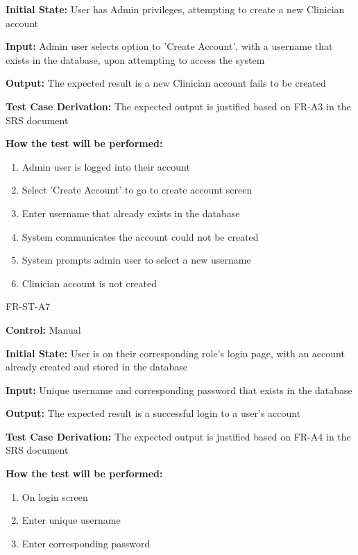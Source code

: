 \documentclass[12pt, titlepage]{article}
\begin{document}
\begin{itemize}
\begin{item}
\begin{mdframed}[linewidth=0.5mm]
    \textbf{Initial State:} User has Admin privileges, attempting to create a new Clinician account \par
    \textbf{Input:} Admin user selects option to 'Create Account', with a username that exists in the database, upon attempting to access the system \par
    \textbf{Output:} The expected result is a new Clinician account fails to be created \par
    \textbf{Test Case Derivation:} The expected output is justified based on FR-A3 in the SRS document \par
    \textbf{How the test will be performed:}
    \begin{enumerate}[noitemsep]
      \item Admin user is logged into their account
      \item Select 'Create Account' to go to create account screen
      \item Enter username that already exists in the database
      \item System communicates the account could not be created
      \item System prompts admin user to select a new username
      \item Clinician account is not created
    \end{enumerate}
\end{mdframed}
\end{item}
\begin{item}
  FR-ST-A7
  \begin{mdframed}[linewidth=0.5mm]
    \textbf{Control:} Manual \par
    \textbf{Initial State:} User is on their corresponding role's login page, with an account already created and stored in the database \par
    \textbf{Input:} Unique username and corresponding password that exists in the database \par
    \textbf{Output:} The expected result is a successful login to a user's account \par
    \textbf{Test Case Derivation:} The expected output is justified based on FR-A4 in the SRS document \par
    \textbf{How the test will be performed:}
    \begin{enumerate}[noitemsep]
      \item On login screen
      \item Enter unique username
      \item Enter corresponding password

\end{enumerate}
\end{mdframed}
\end{item}
\end{itemize}
\end{document}
